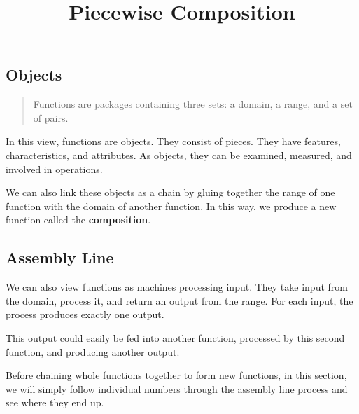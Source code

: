 \documentclass{ximera}
\title{Piecewise Composition}
\begin{document}
\begin{abstract}
\end{abstract}
\maketitle



\subsection*{Objects}


\begin{quote}
Functions are packages containing three sets: a domain, a range, and a set of pairs.
\end{quote}

In this view, functions are objects.  They consist of pieces. They have features, characteristics, and attributes.  As objects, they can be examined, measured, and involved in operations.


We can also link these objects as a chain by gluing together the range of one function with the domain of another function.  In this way, we produce a new function called the \textbf{composition}.












\subsection*{Assembly Line}



We can also view functions as machines processing input.  They take input from the domain, process it, and return an output from the range.  For each input, the process produces exactly one output.



This output could easily be fed into another function, processed by this second function, and producing another output. 



Before chaining whole functions together to form new functions, in this section, we will simply follow individual numbers through the assembly line process and see where they end up.
\end{document}
